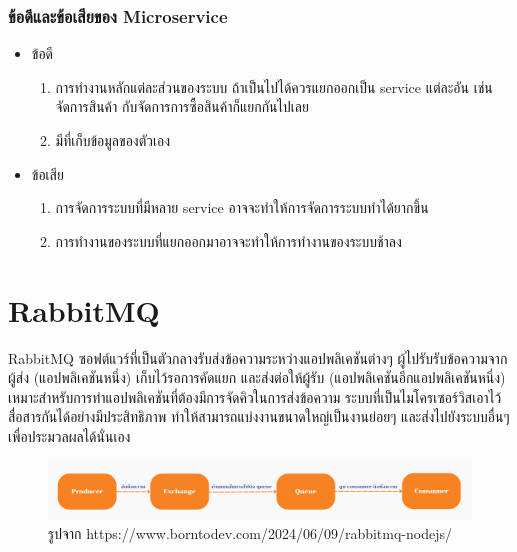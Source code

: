 \subsubsection{ข้อดีและข้อเสียของ Microservice}
\begin{itemize}
  \item ข้อดี
  \begin{enumerate}
    \item การทำงานหลักแต่ละส่วนของระบบ ถ้าเป็นไปได้ควรแยกออกเป็น service แต่ละอัน เช่นจัดการสินค้า กับจัดการการซื้อสินค้าก็แยกกันไปเลย
    \item มีที่เก็บข้อมูลของตัวเอง
  \end{enumerate}
  \item ข้อเสีย
  \begin{enumerate}
    \item การจัดการระบบที่มีหลาย service อาจจะทำให้การจัดการระบบทำได้ยากขึ้น
    \item การทำงานของระบบที่แยกออกมาอาจจะทำให้การทำงานของระบบช้าลง
  \end{enumerate}
\end{itemize}
\clearpage
\section{RabbitMQ}
\hspace{1.27cm}RabbitMQ \cite{rabbitmq}ซอฟต์แวร์ที่เป็นตัวกลางรับส่งข้อความระหว่างแอปพลิเคชันต่างๆ ผู้ไปรับรับข้อความจากผู้ส่ง (แอปพลิเคชันหนึ่ง) เก็บไว้รอการคัดแยก และส่งต่อให้ผู้รับ (แอปพลิเคชันอีกแอปพลิเคชันหนึ่ง) เหมาะสำหรับการทำแอปพลิเคชันที่ต้องมีการจัดคิวในการส่งข้อความ ระบบที่เป็นไมโครเซอร์วิสเอาไว้สื่อสารกันได้อย่างมีประสิทธิภาพ ทำให้สามารถแบ่งงานขนาดใหญ่เป็นงานย่อยๆ และส่งไปยังระบบอื่นๆ เพื่อประมวลผลได้นั่นเอง
\begin{figure}[H] %
    \centering
    \includegraphics[width=\linewidth, keepaspectratio]{pictures/rabbitmq.png}
    \caption[Poem]{รูปจาก https://www.borntodev.com/2024/06/09/rabbitmq-nodejs/}
    \label{fig:rabbitmq}
\end{figure}
